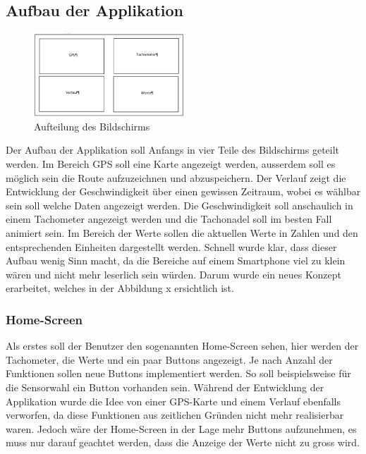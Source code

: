 \subsection{Aufbau der Applikation}


\begin{figure}[ht]
    \includegraphics[width=0.5\textwidth]{3Vorgehen/imag/Aufbau_Applikation_erste_Version.PNG}
    \caption{Aufteilung des Bildschirms}\label{aufbau_applikation_1} 
\end{figure}

Der Aufbau der Applikation soll Anfangs in vier Teile des Bildschirms geteilt werden. 
Im Bereich GPS soll eine Karte angezeigt werden, ausserdem soll es möglich sein die Route aufzuzeichnen und abzuspeichern.
Der Verlauf zeigt die Entwicklung der Geschwindigkeit über einen gewissen Zeitraum, wobei es wählbar sein soll welche Daten angezeigt werden.
Die Geschwindigkeit soll anschaulich in einem Tachometer angezeigt werden und die Tachonadel soll im besten Fall animiert sein.
Im Bereich der Werte sollen die aktuellen Werte in Zahlen und den entsprechenden Einheiten dargestellt werden.
Schnell wurde klar, dass dieser Aufbau wenig Sinn macht, da die Bereiche auf einem Smartphone viel zu klein wären und nicht mehr leserlich sein würden. Darum wurde ein neues Konzept erarbeitet, welches in der Abbildung x ersichtlich ist.

\subsubsection{Home-Screen}

Als erstes soll der Benutzer den sogenannten Home-Screen sehen, hier werden der Tachometer, die Werte und ein paar Buttons angezeigt. Je nach Anzahl der Funktionen sollen neue Buttons implementiert werden. So soll beispielsweise für die Sensorwahl ein Button vorhanden sein. Während der Entwicklung der Applikation wurde die Idee von einer GPS-Karte und einem Verlauf ebenfalls verworfen, da diese Funktionen aus zeitlichen Gründen nicht mehr realisierbar waren. Jedoch wäre der Home-Screen in der Lage mehr Buttons aufzunehmen, es muss nur darauf geachtet werden, dass die Anzeige der Werte nicht zu gross wird.

